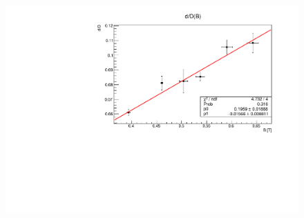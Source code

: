 \documentclass[a4paper,12pt,abstracton]{scrartcl}
\begin{document}
\begin{figure}[H]
    \centering
    \includegraphics[scale=0.6]{plots/zatbs.pdf}
    \caption{}
    \label{fig:zat}
\end{figure}
\end{document}
